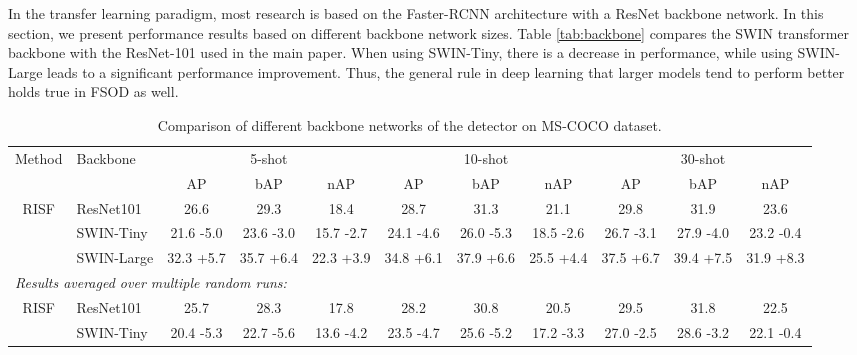 \documentclass{article}
\begin{document}
In the transfer learning paradigm, most research is based on the Faster-RCNN architecture with a ResNet \cite{resnet} backbone network. In this section, we present performance results based on different backbone network sizes.
Table \ref{tab:backbone} compares the SWIN transformer \cite{swin} backbone with the ResNet-101 used in the main paper. When using SWIN-Tiny, there is a decrease in performance, while using SWIN-Large leads to a significant performance improvement. Thus, the general rule in deep learning that larger models tend to perform better holds true in FSOD as well.

\begin{table}[h]
\caption{Comparison of different backbone networks of the detector on MS-COCO dataset.}
\centering
\begin{adjustbox}{width=1.0\textwidth}
{
\begin{tabular}{c|l|ccc|ccc|ccc}
     \toprule
     \multirow{2}{*}{Method}&\multirow{2}{*}{Backbone}& \multicolumn{3}{c|}{5-shot} &\multicolumn{3}{c|}{10-shot}&\multicolumn{3}{c}{30-shot}  \\
      && AP & bAP & nAP & AP & bAP & nAP & AP & bAP & nAP \\
     \hline
     \multirow{3}{*}{RISF} &ResNet101\cite{resnet}& 26.6 & 29.3& 18.4 & 28.7& 31.3 & 21.1 & 29.8 & 31.9 & 23.6 \\
     &SWIN-Tiny\cite{swin} &21.6 {\scriptsize \color{blue}-5.0}&23.6 {\scriptsize \color{blue}-3.0}&15.7 {\scriptsize \color{blue}-2.7}&24.1 {\scriptsize \color{blue}-4.6}&26.0 {\scriptsize \color{blue}-5.3}&18.5 {\scriptsize \color{blue}-2.6}&26.7 {\scriptsize \color{blue}-3.1}&27.9 {\scriptsize \color{blue}-4.0}&23.2 {\scriptsize \color{blue}-0.4}\\
     &SWIN-Large\cite{swin} & 32.3 {\scriptsize \color{red}+5.7}&35.7 {\scriptsize \color{red}+6.4}&22.3 {\scriptsize \color{red}+3.9}&34.8 {\scriptsize \color{red}+6.1}&37.9 {\scriptsize \color{red}+6.6}&25.5 {\scriptsize \color{red}+4.4}&37.5 {\scriptsize \color{red}+6.7}&39.4 {\scriptsize \color{red}+7.5}&31.9 {\scriptsize \color{red}+8.3}  \\
     \midrule
     \multicolumn{10}{l}{\textit{Results averaged over multiple random runs:}}\\
     \multirow{3}{*}{RISF} &ResNet101\cite{resnet}&25.7&28.3&17.8&28.2&30.8&20.5&29.5&31.8&22.5 \\
     &SWIN-Tiny\cite{swin} & 20.4 {\scriptsize \color{blue}-5.3}&22.7 {\scriptsize \color{blue}-5.6}&13.6 {\scriptsize \color{blue}-4.2}&23.5 {\scriptsize \color{blue}-4.7}&25.6 {\scriptsize \color{blue}-5.2}&17.2 {\scriptsize \color{blue}-3.3}&27.0 {\scriptsize \color{blue}-2.5}&28.6 {\scriptsize \color{blue}-3.2}&22.1 {\scriptsize \color{blue}-0.4} \\

\end{tabular}}
\end{adjustbox}
\end{table}
\end{document}
